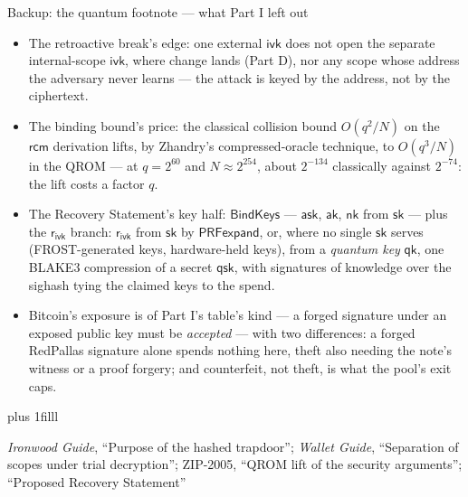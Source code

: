 \documentclass[aspectratio=169,11pt]{beamer}
\newcommand{\aksym}{\ensuremath{\mathsf{ak}}}
\newcommand{\nksym}{\ensuremath{\mathsf{nk}}}
\newcommand{\asksym}{\ensuremath{\mathsf{ask}}}
\newcommand{\ivk}{\ensuremath{\mathsf{ivk}}}
\newcommand{\rcm}{\ensuremath{\mathsf{rcm}}}
\newcommand{\rivk}{\ensuremath{\mathsf{r_{ivk}}}}
\newcommand{\src}[1]{\par\vskip0pt plus 1filll
  {\fontsize{6}{7.2}\selectfont\color{arbdim}\raggedright #1\par}}
\begin{document}
\begin{frame}{Backup: the quantum footnote --- what Part I left out}
\begin{itemize}\small
  \item The retroactive break's edge: one external $\ivk$ does not open
    the separate internal-scope $\ivk$, where change lands (Part D), nor
    any scope whose address the adversary never learns --- the attack is
    keyed by the address, not by the ciphertext.
  \item The binding bound's price: the classical collision bound
    $O(q^2/N)$ on the $\rcm$ derivation lifts, by Zhandry's
    compressed-oracle technique, to $O(q^3/N)$ in the QROM --- at $q =
    2^{60}$ and $N \approx 2^{254}$, about $2^{-134}$ classically against
    $2^{-74}$: the lift costs a factor $q$.
  \item The Recovery Statement's key half: $\mathsf{BindKeys}$ --- $\asksym$,
    $\aksym$, $\nksym$ from $\mathsf{sk}$ --- plus the $\rivk$ branch:
    $\rivk$ from $\mathsf{sk}$ by $\mathsf{PRFexpand}$, or, where no
    single $\mathsf{sk}$ serves (FROST-generated keys, hardware-held
    keys), from a \emph{quantum key} $\mathsf{qk}$, one BLAKE3
    compression of a secret $\mathsf{qsk}$, with signatures of knowledge
    over the sighash tying the claimed keys to the spend.
  \item Bitcoin's exposure is of Part I's table's kind --- a forged
    signature under an exposed public key must be \emph{accepted} --- with
    two differences: a forged RedPallas signature alone spends nothing
    here, theft also needing the note's witness or a proof forgery; and
    counterfeit, not theft, is what the pool's exit caps.
\end{itemize}
\src{\emph{Ironwood Guide}, ``Purpose of the hashed trapdoor''; \emph{Wallet
  Guide}, ``Separation of scopes under trial decryption''; ZIP-2005, ``QROM lift
  of the security arguments''; ``Proposed Recovery Statement''}
\end{frame}
\end{document}
